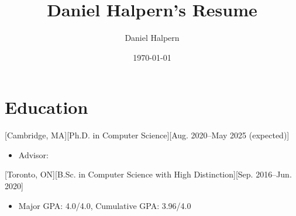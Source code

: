 \documentclass{article}
\title{Daniel Halpern's Resume}
\author{Daniel Halpern}
\date{\today}
\newcommand{\link}[2]{\iftoggle{uselinks}{\href{#1}{#2}}{#2}\xspace}
\begin{document}

    \makecvtitle %

    \section{Education}

    [Cambridge, MA][Ph.D. in Computer Science][Aug. 2020--May 2025 (expected)]
\begin{itemize}
    \item Advisor: \link{http://procaccia.info}{Ariel D. Procaccia}
\end{itemize}

    [Toronto, ON][B.Sc. in Computer Science with High Distinction][Sep. 2016--Jun. 2020]
    \begin{itemize}
        \item Major GPA: 4.0/4.0, Cumulative GPA: 3.96/4.0
    \end{itemize}
    
\end{document}
